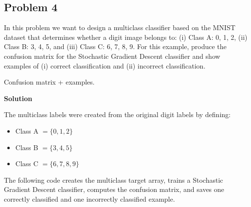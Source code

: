 \documentclass[11pt]{article}
\begin{document}
	\subsection*{Problem 4} In this problem we want to design a multiclass classifier based on the MNIST dataset that determines
	whether a digit image belongs to: (i) Class A: 0, 1, 2, (ii) Class B: 3, 4, 5, and (iii) Class C: 6, 7, 8, 9. For this
	example, produce the confusion matrix for the Stochastic Gradient Descent classifier and show examples of (i) correct
	classification and (ii) incorrect classification.
	
	Confusion matrix + examples.
	
	\textbf{Solution}
	
	The multiclass labels were created from the original digit labels by defining:
	\begin{itemize}
		\item Class A \(= \{0,1,2\}\)
		\item Class B \(= \{3,4,5\}\)
		\item Class C \(= \{6,7,8,9\}\)
	\end{itemize}
	
	The following code creates the multiclass target array, trains a Stochastic Gradient Descent classifier, computes the confusion matrix, and saves one correctly classified and one incorrectly classified example.
	
\end{document}
